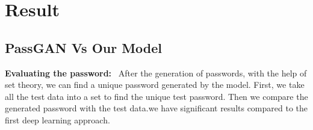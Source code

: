 \documentclass[runningheads]{llncs}
\begin{document}
\section{Result}
\subsection{PassGAN Vs Our Model}
\textbf{Evaluating the password: }~After the generation of passwords, with the help of set theory, we can find a unique password generated by the model. First, we take all the test data into a set to find the unique test password. Then we compare the generated password with the test data.we have significant results compared to the first deep learning approach.
\newline

\begin{table}[htb]
\centering
\caption{Result of passgan using the Rockyou data set in 199000 iterations}
\label{}

\end{table}


\par
\begin{table}[htb]
\centering
\caption{Result of bipassgan using the My space data in 160000 iteration}
\label{}
\end{table}
\end{document}
